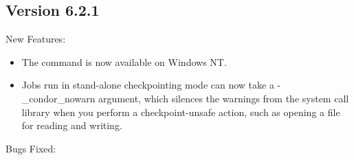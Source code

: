\subsection*{\label{sec:New-6-2-1}Version 6.2.1}

\noindent New Features:

\begin{itemize}

\item The  command is now available on Windows NT.

\item Jobs run in stand-alone checkpointing mode can now take a -\_condor\_nowarn
argument, which silences the warnings from the system call library when you
perform a checkpoint-unsafe action, such as opening a file for reading and
writing.

\end{itemize}

\noindent Bugs Fixed:

